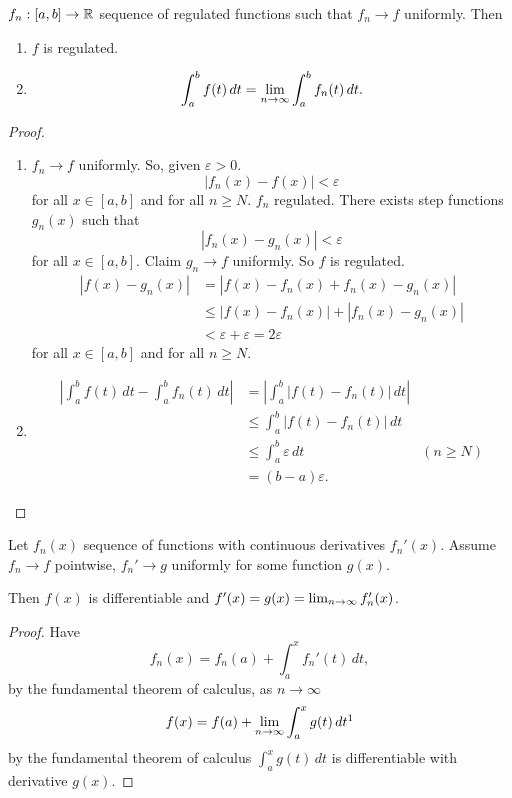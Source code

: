 \begin{theorem}\label{thm:reg_seq_conv_eq}
    $f_n : [a, b] \to \mathbb{R}$ sequence of regulated functions such that $f_n \to f$ uniformly.
    Then
    \begin{enumerate}[label = (\roman*)]
        \item $f$ is regulated.
        
        \item
        \[
        \int_{a}^{b}f(t)\,dt = \lim_{n \rightarrow \infty}\int_{a}^{b}f_n(t)\,dt.
        \]
    \end{enumerate}
\end{theorem}
\begin{proof}
    \begin{enumerate}[label = (\roman*)]
        \item
        $f_n \to f$ uniformly.
        So,
        given $\varepsilon > 0$.
        \[
        |f_n(x) - f(x)| < \varepsilon
        \]
        for all $x \in [a, b]$ and for all $n \geq N$.
        $f_n$ regulated.
        There exists step functions $g_n(x)$ such that
        \[
        |f_n(x) - g_n(x)| < \varepsilon
        \]
        for all $x \in [a, b]$.
        Claim $g_n \to f$ uniformly.
        So $f$ is regulated.
        \begin{align*}
            |f(x) - g_n(x)| &= |f(x) - f_n(x) + f_n(x) - g_n(x)| \\
            &\leq |f(x) - f_n(x)| + |f_n(x) - g_n(x)| \\
            &< \varepsilon + \varepsilon = 2\varepsilon
        \end{align*}
        for all $x \in [a, b]$ and for all $n \geq N$.

        \item
        \begin{align*}
            \left|\int_{a}^{b}f(t)\,dt - \int_{a}^{b}f_n(t)\,dt\right| &= \left|\int_{a}^{b}|f(t) - f_n(t)|\,dt\right| \\
            &\leq \int_{a}^{b}|f(t) - f_n(t)|\,dt \\
            &\leq \int_{a}^{b}\varepsilon\,dt &(n \geq N) \\
            &= (b - a)\varepsilon.
        \end{align*}
    \end{enumerate}
\end{proof}

\begin{theorem}\label{thm:deriv_lim_eq}
    Let $f_n(x)$ sequence of functions with continuous derivatives $f_n'(x)$.
    Assume $f_n \to f$ pointwise,
    $f_n' \to g$ uniformly for some function $g(x)$.

    Then $f(x)$ is differentiable and $f'(x) = g(x) = \lim_{n \rightarrow \infty} f_n'(x)$.
\end{theorem}
\begin{proof}
    Have
    \[
    f_n(x) = f_n(a) + \int_{a}^{x}f_n'(t)\,dt,
    \]
    by the fundamental theorem of calculus,
    as $n \to \infty$
    \[
    f(x) = f(a) + \liminfty\int_{a}^{x}g(t)\,dt\footnotemark
    \]
    by the fundamental theorem of calculus $\int_{a}^{x}g(t)\,dt$ is differentiable with derivative $g(x)$.
\end{proof}

